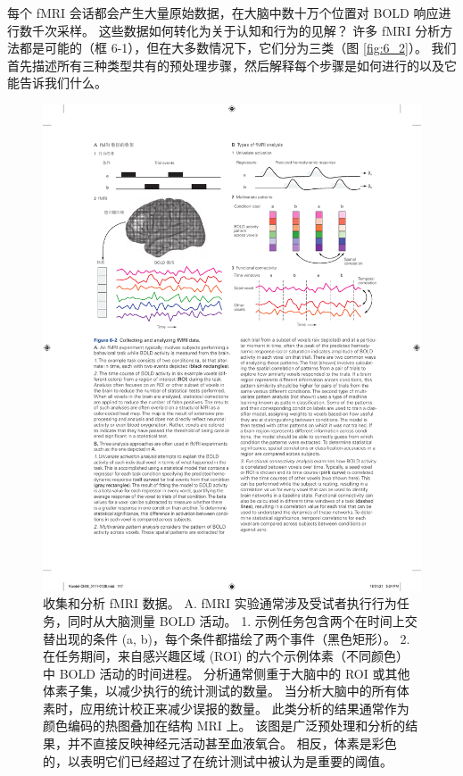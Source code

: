 每个 fMRI 会话都会产生大量原始数据，在大脑中数十万个位置对 BOLD 响应进行数千次采样。 
这些数据如何转化为关于认知和行为的见解？ 
许多 fMRI 分析方法都是可能的（框 6-1），但在大多数情况下，它们分为三类（图 \ref{fig:6_2}）。 
我们首先描述所有三种类型共有的预处理步骤，然后解释每个步骤是如何进行的以及它能告诉我们什么。


\begin{figure}[htbp]
	\centering
	\includegraphics[width=1.0\linewidth]{chap06/fig_6_2}
	\caption{收集和分析 fMRI 数据。 
		A. fMRI 实验通常涉及受试者执行行为任务，同时从大脑测量 BOLD 活动。 
		1. 示例任务包含两个在时间上交替出现的条件 (a, b)，每个条件都描绘了两个事件（黑色矩形）。 
		2. 在任务期间，来自感兴趣区域 (ROI) 的六个示例体素（不同颜色）中 BOLD 活动的时间进程。 
		分析通常侧重于大脑中的 ROI 或其他体素子集，以减少执行的统计测试的数量。 
		当分析大脑中的所有体素时，应用统计校正来减少误报的数量。 
		此类分析的结果通常作为颜色编码的热图叠加在结构 MRI 上。 
		该图是广泛预处理和分析的结果，并不直接反映神经元活动甚至血液氧合。 
		相反，体素是彩色的，以表明它们已经超过了在统计测试中被认为是重要的阈值。 
}
\end{figure}
